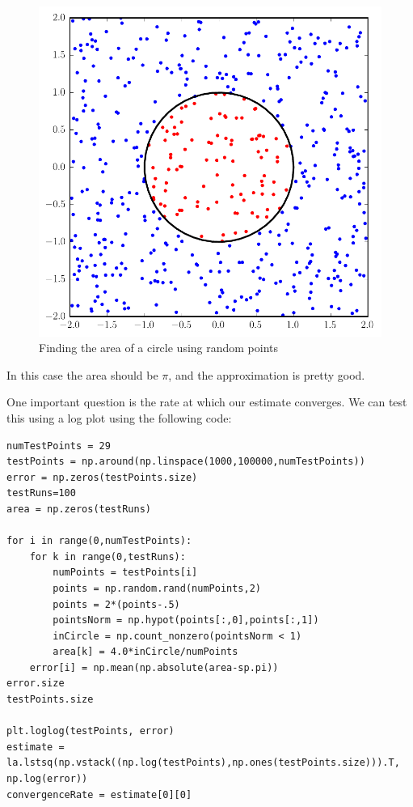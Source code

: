 \begin{figure}
\includegraphics[scale = \textwidth]{MC_Circle}
\caption{Finding the area of a circle using random points}
\label{fig:MCCircle}
\end{figure}

In this case the area should be $\pi$, and the approximation is pretty good.

One important question is the rate at which our estimate converges. 
We can test this using a log plot using the following code:
\begin{lstlisting}
numTestPoints = 29
testPoints = np.around(np.linspace(1000,100000,numTestPoints))
error = np.zeros(testPoints.size)
testRuns=100
area = np.zeros(testRuns)

for i in range(0,numTestPoints):
	for k in range(0,testRuns):
		numPoints = testPoints[i]
		points = np.random.rand(numPoints,2)
		points = 2*(points-.5)
		pointsNorm = np.hypot(points[:,0],points[:,1])
		inCircle = np.count_nonzero(pointsNorm < 1)
		area[k] = 4.0*inCircle/numPoints
	error[i] = np.mean(np.absolute(area-sp.pi))
error.size
testPoints.size

plt.loglog(testPoints, error)
estimate = la.lstsq(np.vstack((np.log(testPoints),np.ones(testPoints.size))).T, np.log(error))
convergenceRate = estimate[0][0]
\end{lstlisting}

